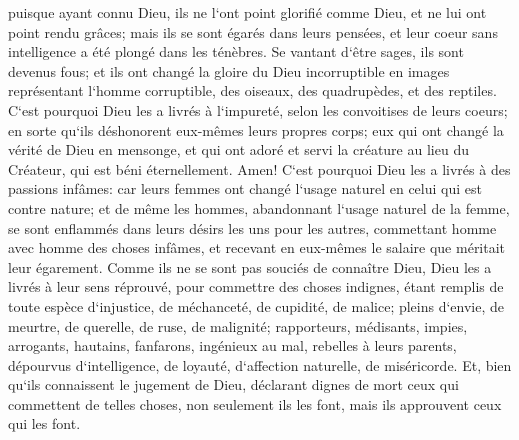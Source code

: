 \verse puisque ayant connu Dieu, ils ne l`ont point glorifié comme Dieu, et ne lui ont point rendu grâces; mais ils se sont égarés dans leurs pensées, et leur coeur sans intelligence a été plongé dans les ténèbres. 
\verse Se vantant d`être sages, ils sont devenus fous; 
\verse et ils ont changé la gloire du Dieu incorruptible en images représentant l`homme corruptible, des oiseaux, des quadrupèdes, et des reptiles. 
\verse C`est pourquoi Dieu les a livrés à l`impureté, selon les convoitises de leurs coeurs; en sorte qu`ils déshonorent eux-mêmes leurs propres corps; 
\verse eux qui ont changé la vérité de Dieu en mensonge, et qui ont adoré et servi la créature au lieu du Créateur, qui est béni éternellement. Amen! 
\verse C`est pourquoi Dieu les a livrés à des passions infâmes: car leurs femmes ont changé l`usage naturel en celui qui est contre nature; 
\verse et de même les hommes, abandonnant l`usage naturel de la femme, se sont enflammés dans leurs désirs les uns pour les autres, commettant homme avec homme des choses infâmes, et recevant en eux-mêmes le salaire que méritait leur égarement. 
\verse Comme ils ne se sont pas souciés de connaître Dieu, Dieu les a livrés à leur sens réprouvé, pour commettre des choses indignes, 
\verse étant remplis de toute espèce d`injustice, de méchanceté, de cupidité, de malice; pleins d`envie, de meurtre, de querelle, de ruse, de malignité; 
\verse rapporteurs, médisants, impies, arrogants, hautains, fanfarons, ingénieux au mal, rebelles à leurs parents, dépourvus d`intelligence, 
\verse de loyauté, d`affection naturelle, de miséricorde. 
\verse Et, bien qu`ils connaissent le jugement de Dieu, déclarant dignes de mort ceux qui commettent de telles choses, non seulement ils les font, mais ils approuvent ceux qui les font. 

